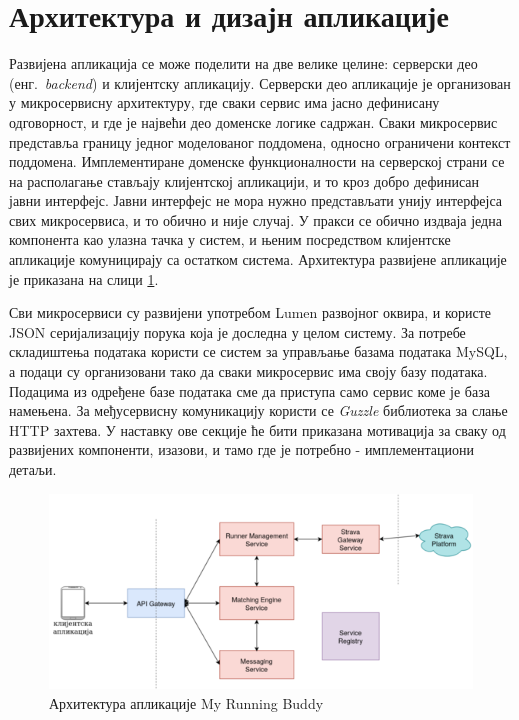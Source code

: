 \documentclass[12pt,oneside]{memoir}
\begin{document}
\section{Архитектура и дизајн апликације}
Развијена апликација се може поделити на две велике целине: серверски део (енг.~\textit{backend}) и клијентску апликацију. Серверски део апликације је организован у микросервисну архитектуру, где сваки сервис има јасно дефинисану одговорност, и где је највећи део доменске логике садржан. Сваки микросервис представља границу једног моделованог поддомена, односно ограничени контекст поддомена. Имплементиране доменске функционалности на серверској страни се на располагање стављају клијентској апликацији, и то кроз добро дефинисан јавни интерфејс. Јавни интерфејс не мора нужно представљати унију интерфејса свих микросервиса, и то обично и није случај. У пракси се обично издваја једна компонента као улазна тачка у систем, и њеним посредством клијентске апликације комуницирају са остатком система. Архитектура развијене апликације је приказана на слици \ref{fig:my-running-buddy}.

Сви микросервиси су развијени употребом Lumen развојног оквира, и користе JSON серијализацију порука која је доследна у целом систему. За потребе складиштења података користи се систем за управљање базама података MySQL, а подаци су организовани тако да сваки микросервис има своју базу података. Подацима из одређене базе података сме да приступа само сервис коме је база намењена. За међусервисну комуникацију користи се \textit{Guzzle} \cite{guzzle} библиотека за слање HTTP захтева. У наставку ове секције ће бити приказана мотивација за сваку од развијених компоненти, изазови, и тамо где је потребно - имплементациони детаљи.

\begin{figure}[!ht]
  \centering
  \includegraphics[scale=0.7]{slike/my-running-buddy.png}
  \caption{Архитектура апликације My Running Buddy}
  \label{fig:my-running-buddy}
\end{figure}
\end{document}
